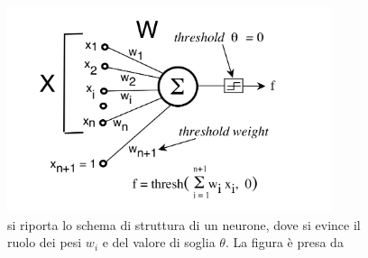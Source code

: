 \newpage
\begin{figure}[h!]
	\centering
	\includegraphics[width=0.85\textwidth]{figs/schema_neurone.png}
	\caption{si riporta lo schema di struttura di un neurone, dove si evince il ruolo dei pesi $w_i$ e del valore di soglia $\theta$. La figura è presa da \cite{IntroML}}
	\label{fig:schema_neurone}
\end{figure}

